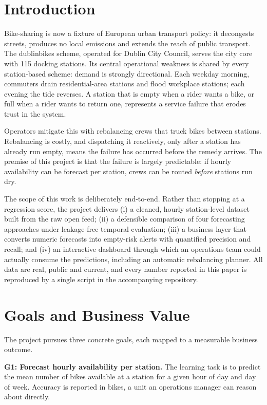 \documentclass[conference]{IEEEtran}
\begin{document}
\section{Introduction}
Bike-sharing is now a fixture of European urban transport policy: it decongests streets, produces no local emissions and extends the reach of public transport. The dublinbikes scheme, operated for Dublin City Council, serves the city core with 115 docking stations. Its central operational weakness is shared by every station-based scheme: demand is strongly directional. Each weekday morning, commuters drain residential-area stations and flood workplace stations; each evening the tide reverses. A station that is empty when a rider wants a bike, or full when a rider wants to return one, represents a service failure that erodes trust in the system.

Operators mitigate this with rebalancing crews that truck bikes between stations. Rebalancing is costly, and dispatching it reactively, only after a station has already run empty, means the failure has occurred before the remedy arrives. The premise of this project is that the failure is largely predictable: if hourly availability can be forecast per station, crews can be routed \emph{before} stations run dry.

The scope of this work is deliberately end-to-end. Rather than stopping at a regression score, the project delivers (i) a cleaned, hourly station-level dataset built from the raw open feed; (ii) a defensible comparison of four forecasting approaches under leakage-free temporal evaluation; (iii) a business layer that converts numeric forecasts into empty-risk alerts with quantified precision and recall; and (iv) an interactive dashboard through which an operations team could actually consume the predictions, including an automatic rebalancing planner. All data are real, public and current, and every number reported in this paper is reproduced by a single script in the accompanying repository.

\section{Goals and Business Value}
The project pursues three concrete goals, each mapped to a measurable business outcome.

\textbf{G1: Forecast hourly availability per station.} The learning task is to predict the mean number of bikes available at a station for a given hour of day and day of week. Accuracy is reported in bikes, a unit an operations manager can reason about directly.
\end{document}
